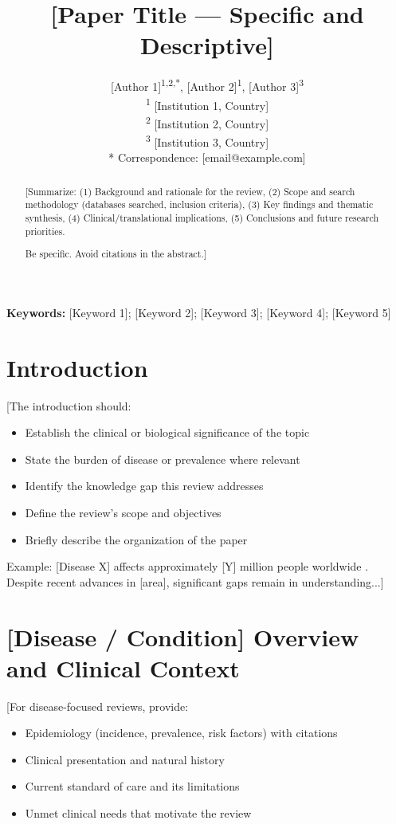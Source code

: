 \documentclass[11pt,a4paper]{article}
\title{[Paper Title — Specific and Descriptive]}
\author{
    [Author 1]\textsuperscript{1,2,*},
    [Author 2]\textsuperscript{1},
    [Author 3]\textsuperscript{3} \\[0.5em]
    \small
    \textsuperscript{1} [Institution 1, Country] \\
    \textsuperscript{2} [Institution 2, Country] \\
    \textsuperscript{3} [Institution 3, Country] \\[0.3em]
    * Correspondence: [email@example.com]
}
\date{}
\begin{document}
\maketitle

\begin{abstract}
[Summarize:
(1) Background and rationale for the review,
(2) Scope and search methodology (databases searched, inclusion criteria),
(3) Key findings and thematic synthesis,
(4) Clinical/translational implications,
(5) Conclusions and future research priorities.

Be specific. Avoid citations in the abstract.]
\end{abstract}

\vspace{0.5cm}
\noindent\textbf{Keywords:} [Keyword 1]; [Keyword 2]; [Keyword 3]; [Keyword 4]; [Keyword 5]

\section{Introduction}
[The introduction should:
\begin{itemize}
    \item Establish the clinical or biological significance of the topic
    \item State the burden of disease or prevalence where relevant \citep{ref1}
    \item Identify the knowledge gap this review addresses
    \item Define the review's scope and objectives
    \item Briefly describe the organization of the paper
\end{itemize}

Example: [Disease X] affects approximately [Y] million people worldwide
\citep{who2024report}. Despite recent advances in [area], significant
gaps remain in understanding...]

\section{[Disease / Condition] Overview and Clinical Context}
[For disease-focused reviews, provide:
\begin{itemize}
    \item Epidemiology (incidence, prevalence, risk factors) with citations
    \item Clinical presentation and natural history
    \item Current standard of care and its limitations
    \item Unmet clinical needs that motivate the review
\end{itemize}
\end{document}
